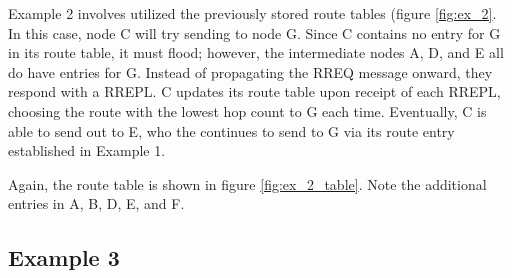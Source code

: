 \documentclass[conference]{IEEEtran}
\begin{document}
Example 2 involves utilized the previously stored route tables (figure \ref{fig:ex_2}. In this case, node C will try sending to node G. Since C contains no entry for G in its route table, it must flood; however, the intermediate nodes A, D, and E all do have entries for G. Instead of propagating the RREQ message onward, they respond with a RREPL. C updates its route table upon receipt of each RREPL, choosing the route with the lowest hop count to G each time. Eventually, C is able to send out to E, who the continues to send to G via its route entry established in Example 1.

Again, the route table is shown in figure \ref{fig:ex_2_table}. Note the additional entries in A, B, D, E, and F.

\subsection{Example 3}
\end{document}
